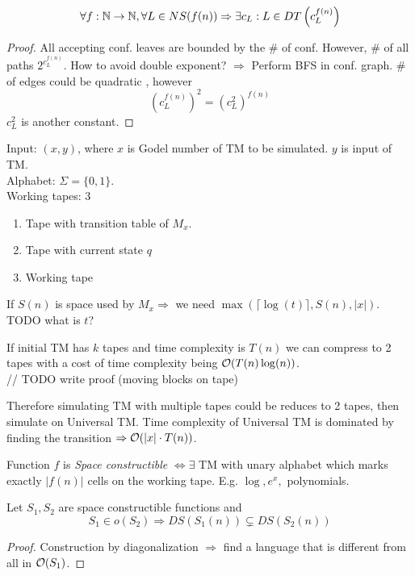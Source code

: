 \begin{theorem}
	\[\forall f:\operatorname{\mathbb{N}} \to \operatorname{\mathbb{N}}, \forall L \in NS(f(n)) \Rightarrow \exists c_L: L \in DT\left(c_L^{f(n)}\right) \]
\end{theorem}
\begin{proof}
	All accepting conf. leaves are bounded by the \# of conf. However, \# of all paths $2^{c_L^{f(n)}}$.
	How to avoid double exponent? $\Rightarrow$ Perform BFS in conf. graph.
	\# of edges could be quadratic , however
	\[ \left(c_L^{f(n)}\right)^2 = \left(c_L^2\right)^{f(n)} \]
	$c_L^2$ is another constant.
\end{proof}

\begin{definition}[Universal TM]
Input: $(x,y)$, where $x$ is Godel number of TM to be simulated. $y$ is input of TM.\\
Alphabet: $\Sigma = \{ 0, 1 \} $.\\
Working tapes: 3
\begin{enumerate}
	\item Tape with transition table of $M_x$.
	\item Tape with current state $q$
	\item Working tape
\end{enumerate}
If $S(n)$ is space used by $M_x \Rightarrow$ we need $\max(\lceil \log(t) \rceil, S(n), |x|)$.\\
TODO what is $t$?
\end{definition}

\begin{observation}
	If initial TM has $k$ tapes and time complexity is $T(n)$ we can compress to 2 tapes with a cost of time complexity being $\mathcal{O}(T(n) \log(n))$. \\
	// TODO write proof (moving blocks on tape)

	Therefore simulating TM with multiple tapes could be reduces to 2 tapes, then simulate on Universal TM.
	Time complexity of Universal TM is dominated by finding the transition $\Rightarrow \mathcal{O}(|x| \cdot T(n))$.
\end{observation}

\begin{definition}
	Function $f$ is \emph{Space constructible} $\iff \exists$ TM with unary alphabet which marks exactly $|f(n)|$ cells on the working tape. E.g. $\log, e^x,$ polynomials.
\end{definition}

\begin{theorem}\label{s_hier}
	Let $S_1, S_2$ are space constructible functions and
	\[ S_1 \in o(S_2) \Rightarrow DS(S_1(n)) \subsetneq DS(S_2(n)) \]
\end{theorem}
\begin{proof}
	Construction by diagonalization $\Rightarrow$ find a language that is different from all in $\mathcal{O}(S_1)$.
\end{proof}

